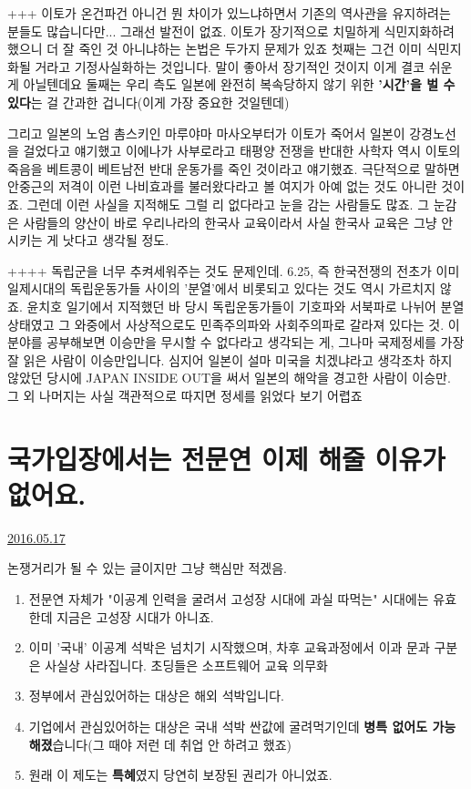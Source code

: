 +++ 이토가 온건파건 아니건 뭔 차이가 있느냐하면서 기존의 역사관을 유지하려는 분들도 많습니다만... 그래선 발전이 없죠.
이토가 장기적으로 치밀하게 식민지화하려 했으니 더 잘 죽인 것 아니냐하는 논법은 두가지 문제가 있죠
첫째는 그건 이미 식민지화될 거라고 기정사실화하는 것입니다. 말이 좋아서 장기적인 것이지 이게 결코 쉬운 게 아닐텐데요
둘째는 우리 측도 일본에 완전히 복속당하지 않기 위한 \textbf{'시간'을 벌 수 있다}는 걸 간과한 겁니다(이게 가장 중요한 것일텐데)
\vspace{5mm}

그리고 일본의 노엄 촘스키인 마루야마 마사오부터가 이토가 죽어서 일본이 강경노선을 걸었다고 얘기했고
이에나가 사부로라고 태평양 전쟁을 반대한 사학자 역시 이토의 죽음을 베트콩이 베트남전 반대 운동가를 죽인 것이라고 얘기했죠.
극단적으로 말하면 안중근의 저격이 이런 나비효과를 불러왔다라고 볼 여지가 아예 없는 것도 아니란 것이죠.
그런데 이런 사실을 지적해도 그럴 리 없다라고 눈을 감는 사람들도 많죠.
그 눈감은 사람들의 양산이 바로 우리나라의 한국사 교육이라서 사실 한국사 교육은 그냥 안 시키는 게 낫다고 생각될 정도.
\vspace{5mm}

++++ 독립군을 너무 추켜세워주는 것도 문제인데.
6.25, 즉 한국전쟁의 전초가 이미 일제시대의 독립운동가들 사이의 '분열'에서 비롯되고 있다는 것도 역시 가르치지 않죠.
윤치호 일기에서 지적했던 바 당시 독립운동가들이 기호파와 서북파로 나뉘어 분열상태였고
그 와중에서 사상적으로도 민족주의파와 사회주의파로 갈라져 있다는 것.
이 분야를 공부해보면 이승만을 무시할 수 없다라고 생각되는 게, 그나마 국제정세를 가장 잘 읽은 사람이 이승만입니다.
심지어 일본이 설마 미국을 치겠냐라고 생각조차 하지 않았던 당시에 JAPAN INSIDE OUT을 써서 일본의 해악을 경고한 사람이 이승만.
그 외 나머지는 사실 객관적으로 따지면 정세를 읽었다 보기 어렵죠
\vspace{5mm}

\section{국가입장에서는 전문연 이제 해줄 이유가 없어요.}
\href{https://www.kockoc.com/Apoc/777839}{2016.05.17}

\vspace{5mm}

논쟁거리가 될 수 있는 글이지만 그냥 핵심만 적겠음.
\vspace{5mm}
\begin{enumerate}
    \item 전문연 자체가 "이공계 인력을 굴려서 고성장 시대에 과실 따먹는" 시대에는 유효한데 지금은 고성장 시대가 아니죠.
    \item 이미 '국내' 이공계 석박은 넘치기 시작했으며, 차후 교육과정에서 이과 문과 구분은 사실상 사라집니다. 초딩들은 소프트웨어 교육 의무화
    \item 정부에서 관심있어하는 대상은 해외 석박입니다.
    \item 기업에서 관심있어하는 대상은 국내 석박 싼값에 굴려먹기인데 \textbf{병특 없어도 가능해졌}습니다(그 때야 저런 데 취업 안 하려고 했죠)
    \item 원래 이 제도는 \textbf{특혜}였지 당연히 보장된 권리가 아니었죠.
\end{enumerate}
\vspace{5mm}

